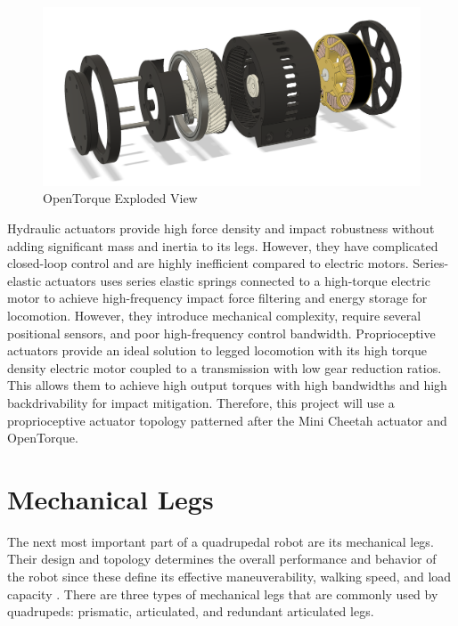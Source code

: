 \documentclass[english]{upeeei}
\begin{document}
\begin{figure}[H]
\begin{centering}
\includegraphics[width=0.8\columnwidth]{images/opentorque}
\par\end{centering}
\caption{OpenTorque Exploded View\label{fig:opentorque}}
\end{figure}

Hydraulic actuators provide high force density and impact robustness without adding significant mass and inertia to its legs. However, they have complicated closed-loop control and are highly inefficient compared to electric motors. Series-elastic actuators uses series elastic springs connected to a high-torque electric motor to achieve high-frequency impact force filtering and energy storage for locomotion. However, they introduce mechanical complexity, require several positional sensors, and poor high-frequency control bandwidth. Proprioceptive actuators provide an ideal solution to legged locomotion with its high torque density electric motor coupled to a transmission with low gear reduction ratios. This allows them to achieve high output torques with high bandwidths and high backdrivability for impact mitigation. Therefore, this project will use a proprioceptive actuator topology patterned after the Mini Cheetah actuator and OpenTorque.

\section{Mechanical Legs}

The next most important part of a quadrupedal robot are its mechanical legs. Their design and topology determines the overall performance and behavior of the robot since these define its effective maneuverability, walking speed, and load capacity \cite{designprinciples}. There are three types of mechanical legs that are commonly used by quadrupeds: prismatic, articulated, and redundant articulated legs. 
\end{document}
